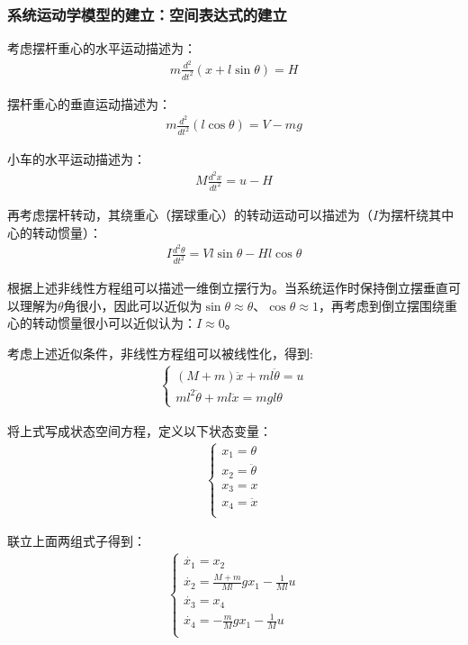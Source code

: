\documentclass{ctexart}
\begin{document}
			\subsubsection{系统运动学模型的建立：空间表达式的建立}
				考虑摆杆重心的水平运动描述为：
				\begin{gather}
					m\frac{d^2}{dt^2}(x+l\sin \theta)=H
				\end{gather}\par
				摆杆重心的垂直运动描述为：
				\begin{gather}
					m\frac{d^2}{dt^2}(l\cos \theta)=V-mg
				\end{gather}\par
				小车的水平运动描述为：
				\begin{gather}
					M\frac{d^2x}{dt^2}=u-H
				\end{gather}\par
				再考虑摆杆转动，其绕重心（摆球重心）的转动运动可以描述为（$I$为摆杆绕其中心的转动惯量）：
				\begin{gather}
					I\frac{d^2\theta}{dt^2}=Vl\sin \theta-Hl\cos \theta
				\end{gather}\par
				根据上述非线性方程组可以描述一维倒立摆行为。当系统运作时保持倒立摆垂直可以理解为$\theta$角很小，因此可以近似为$\sin \theta \approx \theta$、$\cos \theta\approx 1$，再考虑到倒立摆围绕重心的转动惯量很小可以近似认为：$I\approx0$。\par
				考虑上述近似条件，非线性方程组可以被线性化，得到:
				\begin{gather}
					\begin{cases}
						(M+m)\ddot{x}+ml\ddot{\theta}=u\\
						ml^2\ddot{\theta}+ml\ddot{x}=mgl\theta
					\end{cases}
				\end{gather}\par
				将上式写成状态空间方程，定义以下状态变量：
				\begin{gather}
					\begin{cases}
						x_1=\theta\\
						x_2=\ddot{\theta}\\
						x_3=x\\
						x_4=\ddot{x}\\
					\end{cases}
				\end{gather}\par
				联立上面两组式子得到：
				\begin{gather}
					\begin{cases}
						\dot{x_1}=x_2\\
						\dot{x_2}=\frac{M+m}{Ml}gx_1-\frac{1}{Ml}u\\
						\dot{x_3}=x_4\\
						\dot{x_4}=-\frac{m}{M}gx_1-\frac{1}{M}u\\
					\end{cases}
				\end{gather}\par
\end{document}
